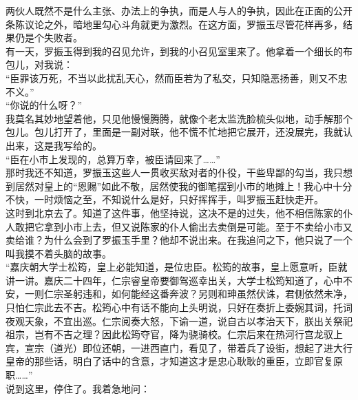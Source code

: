两伙人既然不是什么主张、办法上的争执，而是人与人的争执，因此在正面的公开条陈议论之外，暗地里勾心斗角就更为激烈。在这方面，罗振玉尽管花样再多，结果仍是个失败者。\\

有一天，罗振玉得到我的召见允许，到我的小召见室里来了。他拿着一个细长的布包儿，对我说：\\

“臣罪该万死，不当以此扰乱天心，然而臣若为了私交，只知隐恶扬善，则又不忠不义。”\\

“你说的什么呀？”\\

我莫名其妙地望着他，只见他慢慢腾腾，就像个老太监洗脸梳头似地，动手解那个包儿。包儿打开了，里面是一副对联，他不慌不忙地把它展开，还没展完，我就认出来，这是我写给的。\\

“臣在小市上发现的，总算万幸，被臣请回来了……”\\

那时我还不知道，罗振玉这些人一贯收买敌对者的仆役，干些卑鄙的勾当，我只想到居然对皇上的“恩赐”如此不敬，居然使我的御笔摆到小市的地摊上！我心中十分不快，一时烦恼之至，不知说什么是好，只好挥挥手，叫罗振玉赶快走开。\\

这时到北京去了。知道了这件事，他坚持说，这决不是的过失，他不相信陈家的仆人敢把它拿到小市上去，但又说陈家的仆人偷出去卖倒是可能。至于不卖给小市又卖给谁？为什么会到了罗振玉手里？他却不说出来。在我追问之下，他只说了一个叫我摸不着头脑的故事。\\

“嘉庆朝大学士松筠，皇上必能知道，是位忠臣。松筠的故事，皇上愿意听，臣就讲一讲。嘉庆二十四年，仁宗睿皇帝要御驾巡幸出关，大学士松筠知道了，心中不安，一则仁宗圣躬违和，如何能经这番奔波？另则和珅虽然伏诛，君侧依然未净，只怕仁宗此去不吉。松筠心中有话不能向上头明说，只好在奏折上委婉其词，托词夜观天象，不宜出巡。仁宗阅奏大怒，下谕一道，说自古以孝治天下，朕出关祭祀祖宗，岂有不吉之理？因此松筠夺官，降为骁骑校。仁宗后来在热河行宫龙驭上宾，宣宗（道光）即位还朝，一进西直门，看见了，带着兵了设街，想起了进大行皇帝的那些话，明白了话中的含意，才知道这才是忠心耿耿的重臣，立即官复原职……”\\

说到这里，停住了。我着急地问：\\


